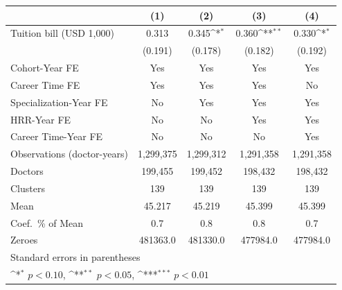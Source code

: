 {
\def\sym#1{\ifmmode^{#1}\else\(^{#1}\)\fi}
\begin{tabular}{l*{4}{c}}
\hline\hline
                    &\multicolumn{1}{c}{(1)}         &\multicolumn{1}{c}{(2)}         &\multicolumn{1}{c}{(3)}         &\multicolumn{1}{c}{(4)}         \\
\hline
Tuition bill (USD 1,000)&       0.313         &       0.345\sym{*}  &       0.360\sym{**} &       0.330\sym{*}  \\
                    &     (0.191)         &     (0.178)         &     (0.182)         &     (0.192)         \\
[1em]
Cohort-Year FE      &         Yes         &         Yes         &         Yes         &         Yes         \\
[1em]
Career Time FE      &         Yes         &         Yes         &         Yes         &          No         \\
[1em]
Specialization-Year FE&          No         &         Yes         &         Yes         &         Yes         \\
[1em]
HRR-Year FE         &          No         &          No         &         Yes         &         Yes         \\
[1em]
Career Time-Year FE &          No         &          No         &          No         &         Yes         \\
\hline
Observations (doctor-years)&   1,299,375         &   1,299,312         &   1,291,358         &   1,291,358         \\
Doctors             &     199,455         &     199,452         &     198,432         &     198,432         \\
Clusters            &         139         &         139         &         139         &         139         \\
Mean                &      45.217         &      45.219         &      45.399         &      45.399         \\
Coef.\ \% of Mean   &         0.7         &         0.8         &         0.8         &         0.7         \\
Zeroes              &    481363.0         &    481330.0         &    477984.0         &    477984.0         \\
\hline\hline
\multicolumn{5}{l}{\footnotesize Standard errors in parentheses}\\
\multicolumn{5}{l}{\footnotesize \sym{*} \(p<0.10\), \sym{**} \(p<0.05\), \sym{***} \(p<0.01\)}\\
\end{tabular}
}
